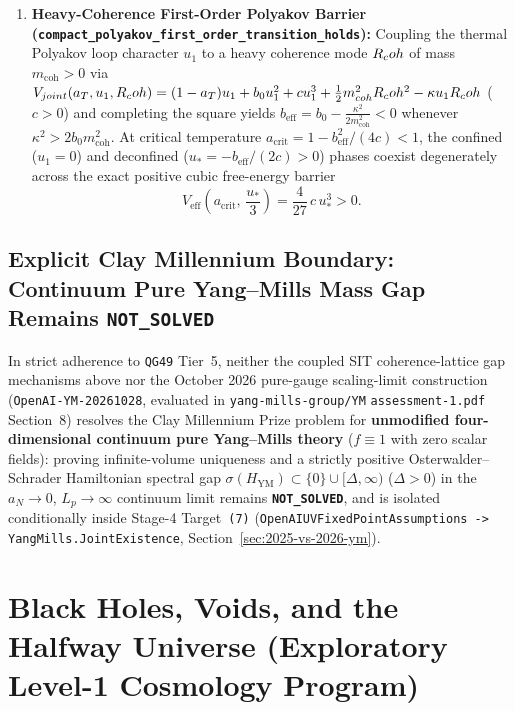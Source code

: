 \begin{enumerate}[leftmargin=2em]
  \item \textbf{Heavy-Coherence First-Order Polyakov Barrier (\texttt{compact\_\allowbreak{}polyakov\_\allowbreak{}first\_\allowbreak{}order\_\allowbreak{}transition\_\allowbreak{}holds}):} Coupling the thermal Polyakov loop character $u_1$ to a heavy coherence mode $R_coh$ of mass $m_{\mathrm{coh}} > 0$ via $V_{joint}(a_T, u_1, R_coh) = (1-a_T)u_1 + b_0 u_1^2 + c u_1^3 + \frac{1}{2}m_{coh}^2R_coh^2 - \kappa u_1R_coh$ ($c > 0$) and completing the square yields $b_{\mathrm{eff}} = b_0 - \frac{\kappa^2}{2 m_{\mathrm{coh}}^2} < 0$ whenever $\kappa^2 > 2 b_0 m_{\mathrm{coh}}^2$. At critical temperature $a_{\mathrm{crit}} = 1 - b_{\mathrm{eff}}^2/(4c) < 1$, the confined ($u_1 = 0$) and deconfined ($u_* = -b_{\mathrm{eff}}/(2c) > 0$) phases coexist degenerately across the exact positive cubic free-energy barrier
  \begin{equation}
  V_{\mathrm{eff}}\!\left(a_{\mathrm{crit}},\,\frac{u_*}{3}\right) = \frac{4}{27}\,c\,u_*^3 > 0.
  \label{eq:sec49_polyakov_barrier}
  \end{equation}
\end{enumerate}

\subsection{Explicit Clay Millennium Boundary: Continuum Pure Yang--Mills Mass Gap Remains \texttt{NOT\_SOLVED}}

In strict adherence to \texttt{QG49} Tier~5, neither the coupled SIT coherence-lattice gap mechanisms above nor the October 2026 pure-gauge scaling-limit construction (\texttt{OpenAI-YM-20261028}, evaluated in \texttt{yang-mills-group/YM} \texttt{assessment-1.pdf} Section~8) resolves the Clay Millennium Prize problem for \textbf{unmodified four-dimensional continuum pure Yang--Mills theory} ($f \equiv 1$ with zero scalar fields): proving infinite-volume uniqueness and a strictly positive Osterwalder--Schrader Hamiltonian spectral gap $\sigma(H_{\mathrm{YM}}) \subset \{0\} \cup [\Delta, \infty)$ ($\Delta > 0$) in the $a_N \to 0$, $L_p \to \infty$ continuum limit remains \textbf{\texttt{NOT\_SOLVED}}, and is isolated conditionally inside Stage-4 Target~\texttt{(7)} (\texttt{Open\allowbreak{}AIUVFixed\allowbreak{}Point\allowbreak{}Assumptions -> Yang\allowbreak{}Mills.\allowbreak{}Joint\allowbreak{}Existence}, Section~\ref{sec:2025-vs-2026-ym}).

\section{Black Holes, Voids, and the Halfway Universe (Exploratory Level-1 Cosmology Program)}
\label{sec:black-holes-voids}
\label{sec:blackholesvoids}

